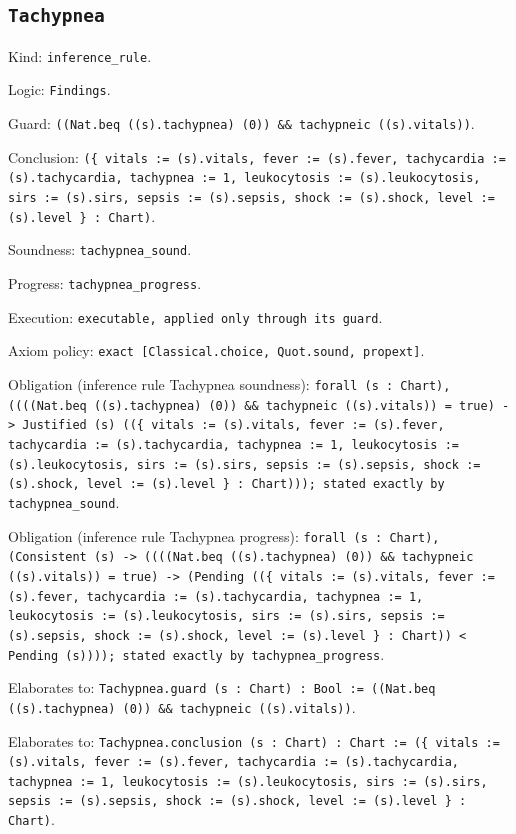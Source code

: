\documentclass[11pt]{article}
\begin{document}
\subsection*{\texttt{Tachypnea}}
\noindent Kind: \texttt{inference_rule}.\par
\noindent Logic: \texttt{Findings}.\par
\noindent Guard: \texttt{((Nat.beq ((s).tachypnea) (0)) \&\& tachypneic ((s).vitals))}.\par
\noindent Conclusion: \texttt{(\{ vitals := (s).vitals, fever := (s).fever, tachycardia := (s).tachycardia, tachypnea := 1, leukocytosis := (s).leukocytosis, sirs := (s).sirs, sepsis := (s).sepsis, shock := (s).shock, level := (s).level \} : Chart)}.\par
\noindent Soundness: \texttt{tachypnea\_sound}.\par
\noindent Progress: \texttt{tachypnea\_progress}.\par
\noindent Execution: \texttt{executable, applied only through its guard}.\par
\noindent Axiom policy: \texttt{exact [Classical.choice, Quot.sound, propext]}.\par
\noindent Obligation (inference rule Tachypnea soundness): \texttt{forall (s : Chart), ((((Nat.beq ((s).tachypnea) (0)) \&\& tachypneic ((s).vitals)) = true) -> Justified (s) ((\{ vitals := (s).vitals, fever := (s).fever, tachycardia := (s).tachycardia, tachypnea := 1, leukocytosis := (s).leukocytosis, sirs := (s).sirs, sepsis := (s).sepsis, shock := (s).shock, level := (s).level \} : Chart))); stated exactly by tachypnea\_sound}.\par
\noindent Obligation (inference rule Tachypnea progress): \texttt{forall (s : Chart), (Consistent (s) -> ((((Nat.beq ((s).tachypnea) (0)) \&\& tachypneic ((s).vitals)) = true) -> (Pending ((\{ vitals := (s).vitals, fever := (s).fever, tachycardia := (s).tachycardia, tachypnea := 1, leukocytosis := (s).leukocytosis, sirs := (s).sirs, sepsis := (s).sepsis, shock := (s).shock, level := (s).level \} : Chart)) < Pending (s)))); stated exactly by tachypnea\_progress}.\par
\noindent Elaborates to: \texttt{Tachypnea.guard (s : Chart) : Bool := ((Nat.beq ((s).tachypnea) (0)) \&\& tachypneic ((s).vitals))}.\par
\noindent Elaborates to: \texttt{Tachypnea.conclusion (s : Chart) : Chart := (\{ vitals := (s).vitals, fever := (s).fever, tachycardia := (s).tachycardia, tachypnea := 1, leukocytosis := (s).leukocytosis, sirs := (s).sirs, sepsis := (s).sepsis, shock := (s).shock, level := (s).level \} : Chart)}.\par
\end{document}
